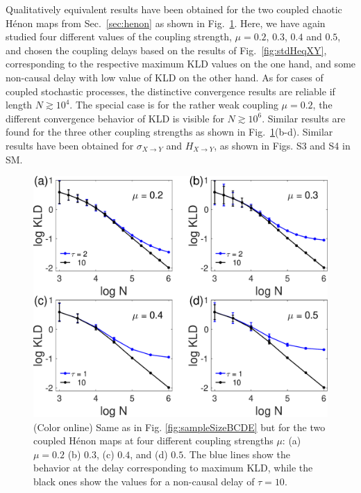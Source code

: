 \documentclass[12pt,aip,cha,reprint,nofootinbib]{revtex4-1}
\begin{document}
Qualitatively equivalent results have been obtained for the two coupled chaotic H\'enon maps from Sec.~\ref{sec:henon} as shown in Fig.~\ref{fig:sampleSizeHenon}. Here, we have again studied four different values of the coupling strength, $\mu = 0.2$, $0.3$, $0.4$ and $0.5$, and chosen the coupling delays based on the results of Fig.~\ref{fig:stdHeqXY}, corresponding to the respective maximum KLD values on the one hand, and some non-causal delay with low value of KLD on the other hand. {\color{red}As for cases of coupled stochastic processes, the distinctive convergence results are reliable if length $N \gtrsim 10^4$. The special case is for} the rather weak coupling $\mu = 0.2$, the different convergence behavior of KLD is visible for $N \gtrsim 10^6$. Similar results are found for the three other coupling strengths as shown in Fig.~\ref{fig:sampleSizeHenon}(b-d). {\color{red}Similar results have been obtained for $\sigma_{X\to Y}$ and $H_{X\to Y}$, as shown in Figs. S3 and S4 in SM. }
\begin{figure}
	\centering
	\includegraphics[width=\columnwidth]{kld_lengthHenon.eps}
\caption{(Color online) Same as in Fig. \ref{fig:sampleSizeBCDE} but for the two coupled H\'enon maps at four different coupling strengths $\mu$: (a) $\mu=0.2$ (b) $0.3$, (c) $0.4$, and (d) $0.5$. The blue lines show the behavior at the delay corresponding to maximum KLD, while the black ones show the values for a non-causal delay of $\tau=10$. \label{fig:sampleSizeHenon}}
\end{figure}
\end{document}

